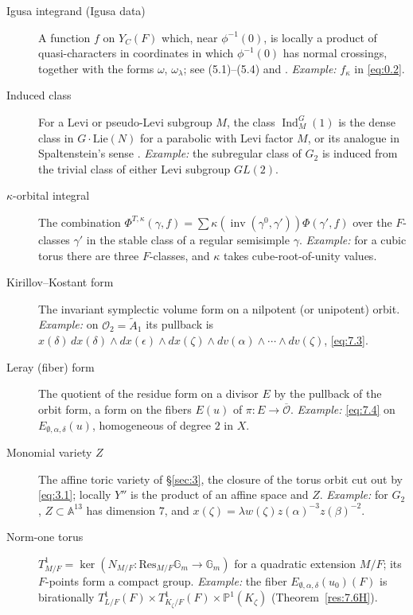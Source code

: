 \documentclass[12pt,letterpaper]{amsart}
\theoremstyle{plain}
\theoremstyle{definition}
\theoremstyle{remark}
\theoremstyle{definition}
\newcommand{\ovo}{\overline{\mathcal{O}}}
\newcommand{\aaa}{\mathbb{A}}
\newcommand{\gga}{\mathbb{G}}
\DeclareMathOperator{\Ind}{Ind}
\DeclareMathOperator{\inv}{inv}
\begin{document}
\begin{description}
\item[Igusa integrand (Igusa data)] A function $f$ on $Y_C(F)$ which, near
$\phi^{-1}(0)$, is locally a product of quasi-characters in coordinates in
which $\phi^{-1}(0)$ has normal crossings, together with the forms
$\omega$, $\omega_\lambda$; see (5.1)--(5.4) and \cite{LS83}. \emph{Example:}
$f_\kappa$ in \eqref{eq:0.2}.

\item[Induced class] For a Levi or pseudo-Levi subgroup $M$, the class
$\Ind_M^G(1)$ is the dense class in $G\cdot\mathrm{Lie}(N)$ for a parabolic with
Levi factor $M$, or its analogue in Spaltenstein's sense \cite{Spa82}.
\emph{Example:} the subregular class of $G_2$ is induced from the trivial class
of either Levi subgroup $GL(2)$.

\item[$\kappa$-orbital integral] The combination
$\Phi^{T,\kappa}(\gamma,f)=\sum\kappa(\inv(\gamma^0,\gamma'))\Phi(\gamma',f)$
over the $F$-classes $\gamma'$ in the stable class of a regular semisimple
$\gamma$. \emph{Example:} for a cubic torus there are three $F$-classes, and
$\kappa$ takes cube-root-of-unity values.

\item[Kirillov--Kostant form] The invariant symplectic volume form on a
nilpotent (or unipotent) orbit. \emph{Example:} on $\mathcal O_2=\tilde A_1$ its
pullback is $x(\delta)\,dx(\delta)\wedge dx(\epsilon)\wedge dx(\zeta)\wedge
dv(\alpha)\wedge\cdots\wedge dv(\zeta)$, \eqref{eq:7.3}.

\item[Leray (fiber) form] The quotient of the residue form on a divisor $E$ by
the pullback of the orbit form, a form on the fibers $E(u)$ of $\pi:E\to\ovo$.
\emph{Example:} \eqref{eq:7.4} on $E_{\emptyset,\alpha,\delta}(u)$, homogeneous of
degree $2$ in $X$.

\item[Monomial variety $Z$] The affine toric variety of \S\ref{sec:3}, the
closure of the torus orbit cut out by \eqref{eq:3.1}; locally $Y''$ is the
product of an affine space and $Z$. \emph{Example:} for $G_2$, $Z\subset\aaa^{13}$
has dimension $7$, and $x(\zeta)=\lambda w(\zeta)z(\alpha)^{-3}z(\beta)^{-2}$.

\item[Norm-one torus] $T^1_{M/F}=\ker(N_{M/F}:\mathrm{Res}_{M/F}\gga_m\to\gga_m)$
for a quadratic extension $M/F$; its $F$-points form a compact group.
\emph{Example:} the fiber $E_{\emptyset,\alpha,\delta}(u_0)(F)$ is birationally
$T^1_{L/F}(F)\times T^1_{K_\zeta/F}(F)\times\mathbb P^1(K_\zeta)$
(Theorem~\ref{res:7.6H}).


\end{description}
\end{document}
